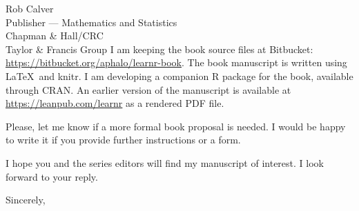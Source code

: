 \documentclass[a4paper]{scrlttr2}
\begin{document}
\begin{letter}{Rob Calver\\Publisher --- Mathematics and Statistics\\ Chapman \& Hall/CRC\\ Taylor \& Francis Group}
I am keeping the book source files at Bitbucket: \url{https://bitbucket.org/aphalo/learnr-book}. The book manuscript is written using \LaTeX\ and knitr. I am developing a companion R package for the book, available through CRAN. An earlier version of the manuscript is available at \url{https://leanpub.com/learnr} as a rendered PDF file.

Please, let me know if a more formal book proposal is needed. I would be happy to write it if you provide further instructions or a form.

I hope you and the series editors will find my manuscript of interest. I look forward to your reply.

\closing{Sincerely,}


\end{letter}
\end{document}
